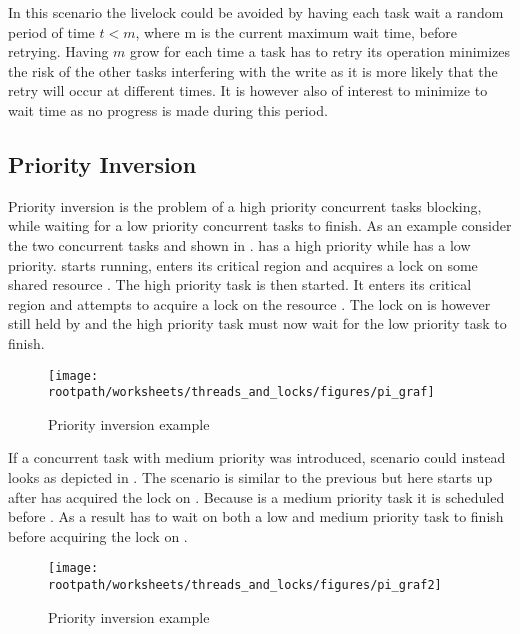 In this scenario the livelock could be avoided by having each task wait a random period of time $t < m$, where m is the current maximum wait time, before retrying. Having $m$ grow for each time a task has to retry its operation minimizes the risk of the other tasks interfering with the write as it is more likely that the retry will occur at different times. It is however also of interest to minimize to wait time as no progress is made during this period.


\subsection{Priority Inversion}
Priority inversion is the problem of a high priority concurrent tasks blocking, while waiting for a low priority concurrent tasks to finish\cite[p. 456]{tanenbaum2008modern}. As an example consider the two concurrent tasks  and  shown in .  has a high priority while  has a low priority.  starts running, enters its critical region and acquires a lock on some shared resource . The high priority task  is then started. It enters its critical region and attempts to acquire a lock on the resource . The lock on  is however still held by  and the high priority task  must now wait for the low priority task  to finish.

\begin{figure}[htbp]
\centering
 \texttt{[image: \\rootpath/worksheets/threads\_and\_locks/figures/pi\_graf]} 
 \caption{Priority inversion example}
\label{fig:priority_inversion}
\end{figure}
If a concurrent task  with medium priority was introduced, scenario could instead looks as depicted in . The scenario is similar to the previous but here  starts up after  has acquired the lock on . Because  is a medium priority task it is scheduled before . As a result  has to wait on both a low and medium priority task to finish before acquiring the lock on .

\begin{figure}[htbp]
\centering
 \texttt{[image: \\rootpath/worksheets/threads\_and\_locks/figures/pi\_graf2]} 
 \caption{Priority inversion example}
\label{fig:priority_inversion_m}
\end{figure}

